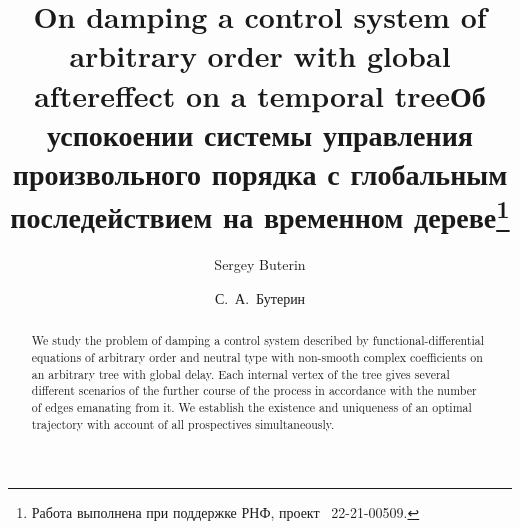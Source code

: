 \begin{englishtitle} %
\title{On damping a control system of arbitrary order with global aftereffect on a temporal tree}
\author{Sergey Buterin}

\maketitle

\begin{abstract}
We study the problem of damping a control system described by functional-differential equations of arbitrary order and neutral type with
non-smooth complex coefficients on an arbitrary tree with global delay. Each internal vertex of the tree gives several different scenarios of
the further course of the process in accordance with the number of edges emanating from it. We establish the existence and uniqueness of an
optimal trajectory with account of all prospectives simultaneously.

\end{abstract}
\end{englishtitle}

\iffalse
\documentclass[12pt]{llncs}


\usepackage{iftex}

\ifPDFTeX
\usepackage[T2A]{fontenc}
\usepackage[utf8]{inputenc} %
\usepackage[english,russian]{babel}
\fi

\usepackage{todonotes}

\usepackage[russian]{nla}


\fi

\title{Об успокоении системы управления произвольного порядка с глобальным последействием на временном 
дереве\thanks{Работа выполнена при поддержке РНФ, проект \textnumero~22-21-00509.}}
\author{С.~А.~Бутерин   %
} %


